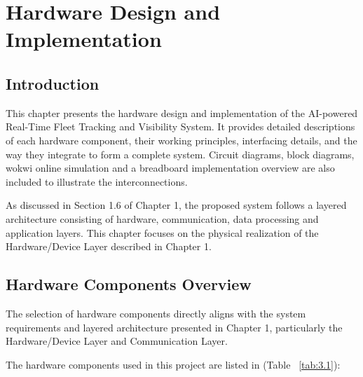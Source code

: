 

\maketitle

\chapter{Hardware Design and Implementation}

\section{Introduction}
This chapter presents the hardware design and implementation of the AI-powered Real-Time Fleet Tracking and Visibility System. It provides detailed descriptions of each hardware component, their working principles, interfacing details, and the way they integrate to form a complete system. Circuit diagrams, block diagrams, wokwi online simulation and a breadboard implementation overview are also included to illustrate the interconnections.

As discussed in Section 1.6 of Chapter 1, the proposed system follows a layered architecture consisting of hardware, communication, data processing and application layers. This chapter focuses on the physical realization of the Hardware/Device Layer described in Chapter 1.

\section{Hardware Components Overview}
The selection of hardware components directly aligns with the system requirements and layered architecture presented in Chapter 1, particularly the Hardware/Device Layer and Communication Layer.

The hardware components used in this project are listed in (Table ~\ref{tab:3.1}):

\usepackage{graphicx} %

